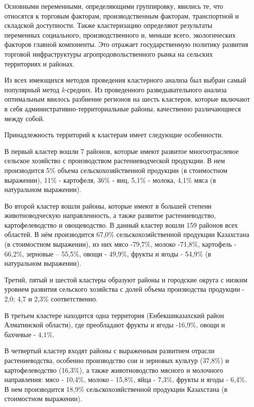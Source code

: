 \begin{multicols}{2}
Основными переменными, определяющими группировку, явились те, что
относятся к торговым факторам, производственным факторам, транспортной и
складской доступности. Также кластеризацию определяют результаты
переменных социального, производственного и, меньше всего, экологических
факторов главной компоненты. Это отражает государственную политику
развития торговой инфраструктуры агропродовольственного рынка на
сельских территориях и районах.

Из всех имеющихся методов проведения кластерного анализа был выбран
самый популярный метод \emph{k}-средних. Из проведенного
разведывательного анализа оптимальным явилось разбиение регионов на
шесть кластеров, которые включают в себя административно-территориальные
районы, качественно различающиеся между собой.

Принадлежность территорий к кластерам имеет следующие особенности.

В первый кластер вошли 7 районов, которые имеют развитое многоотраслевое
сельское хозяйство с производством растениеводческой продукции. В нем
производится 5\% объема сельскохозяйственной продукции (в стоимостном
выражении), 11\% - картофеля, 36\% - яиц, 5,1\% - молока, 4,1\% мяса (в
натуральном выражении).

Во второй кластер вошли районы, которые имеют в большей степени
животноводческую направленность, а также развитое растениеводство,
картофелеводство и овощеводство. В данный кластер вошли 159 районов всех
областей. В нём производится 67,0\% сельскохозяйственной продукции
Казахстана (в стоимостном выражении), из них мясо -79,7\%, молоко
-71,8\%, картофель - 66,2\%, зерновые -- 55,5\%, овощи - 49,9\%, фрукты
и ягоды - 54,9\% (в натуральном выражении).

Третий, пятый и шестой кластеры образуют районы и городские округа с
низким уровнем развития сельского хозяйства с долей объема производства
продукции - 2,0; 4,7 и 2,3\% соответственно.

В третьем кластере находится одна территория (Енбекшиказахский район
Алматинской области), где преобладают фрукты и ягоды -16,9\%, овощи и
бахчевые - 4,1\%.

В четвертый кластер входят районы с выраженным развитием отрасли
растениеводства, особенно производство сои и зерновых культур (37,8\%) и
картофелеводство (16,3\%), а также животноводство мясного и молочного
направления: мясо - 10,4\%, молоко - 15,8\%, яйца - 7,3\%, фрукты и
ягоды - 6,4\%. В нем производится 18,9\% сельскохозяйственной продукции
Казахстана (в стоимостном выражении).


\end{multicols}
